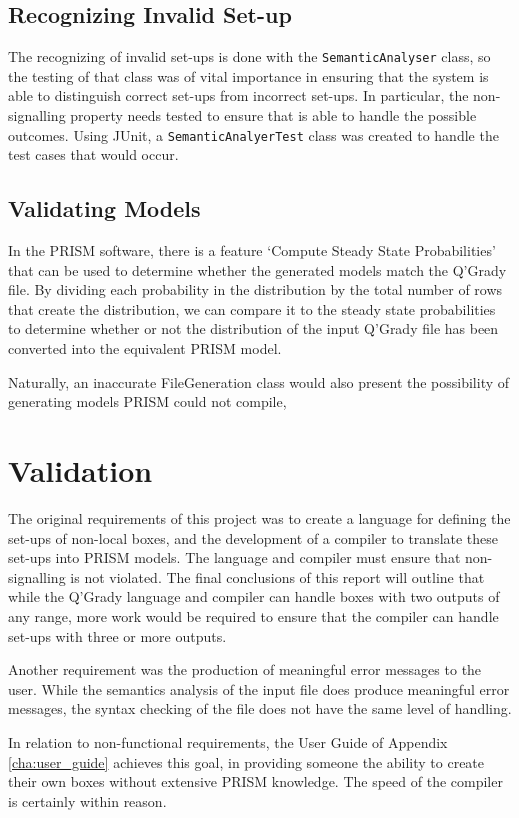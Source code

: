 \documentclass[report.tex]{subfiles}
\begin{document}
\subsection{Recognizing Invalid Set-up} %
\label{sub:recognizing_invalid_set_up}
The recognizing of invalid set-ups is done with the \texttt{SemanticAnalyser}
class, so the testing of that class was of vital importance in ensuring that
the system is able to distinguish correct set-ups from incorrect set-ups. In
particular, the non-signalling property needs tested to ensure that is able to
handle the possible outcomes. Using JUnit, a \texttt{SemanticAnalyerTest} class
was created to handle the test cases that would occur.


\subsection{Validating Models} %
\label{sub:validating_models}
In the PRISM software, there is a feature `Compute Steady State Probabilities'
that can be used to determine whether the generated models match the Q'Grady
file. By dividing each probability in the distribution by the total number of
rows that create the distribution, we can compare it to the steady state
probabilities to determine whether or not the distribution of the input Q'Grady
file has been converted into the equivalent PRISM model.

Naturally, an inaccurate FileGeneration class would also present the
possibility of generating models PRISM could not compile, 

\section{Validation} %
\label{sec:validation}
The original requirements of this project was to create a language for defining
the set-ups of non-local boxes, and the development of a compiler to translate
these set-ups into PRISM models. The language and compiler must ensure that
non-signalling is not violated. The final conclusions of this report will
outline that while the Q'Grady language and compiler can handle boxes with two
outputs of any range, more work would be required to ensure that the compiler
can handle set-ups with three or more outputs.

Another requirement was the production of meaningful error messages to the user.
While the semantics analysis of the input file does produce meaningful error
messages, the syntax checking of the file does not have the same level of
handling.

In relation to non-functional requirements, the User Guide of Appendix
\ref{cha:user_guide} achieves this goal, in providing someone the ability to
create their own boxes without extensive PRISM knowledge. The speed of the
compiler is certainly within reason.
\newpage
\end{document}

